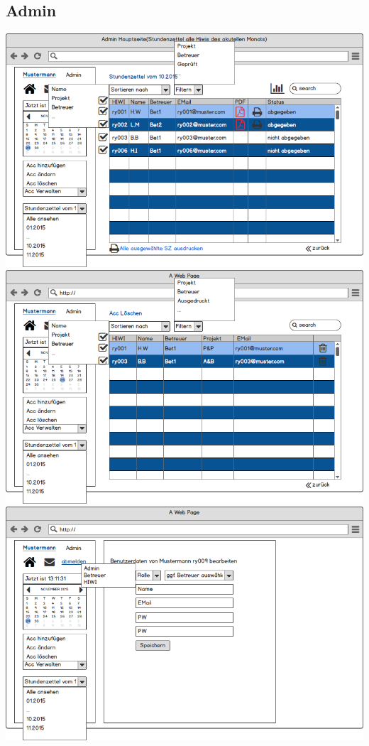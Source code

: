 \subsection{Admin}
\includegraphics[width=\linewidth]{UI/Admin/Hauptseite.png}
\includegraphics[width=\linewidth]{UI/Admin/Accounts/Ubersicht.png}
\includegraphics[width=\linewidth]{UI/Admin/Accounts/Bearbeiten.png}
